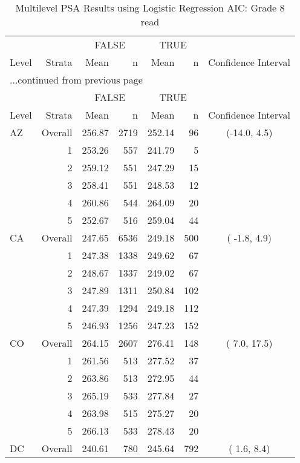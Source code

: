 \begin{longtable}{lrrr@{\extracolsep{.25cm}}rrc}
\caption{Multilevel PSA Results using Logistic Regression AIC: Grade 8 read} \\ 
   \hline & & \multicolumn{2}{c}{FALSE} & \multicolumn{2}{c}{TRUE} & \\ \cline{3-4} \cline{5-6} Level & Strata & Mean & n & Mean & n & Confidence Interval \\ \hline\endfirsthead \multicolumn{7}{l}{{...continued from previous page}}\\ \hline  & & \multicolumn{2}{c}{FALSE} & \multicolumn{2}{c}{TRUE} & \\ \cline{3-4} \cline{5-6} Level & Strata & Mean & n & Mean & n & Confidence Interval \\ \hline \endhead \endfoot \endlastfoot  \hline
AZ & Overall & 256.87 & 2719 & 252.14 &  96 & (-14.0,   4.5) \\ 
   & 1 & 253.26 & 557 & 241.79 &   5 &  \\ 
   & 2 & 259.12 & 551 & 247.29 &  15 &  \\ 
   & 3 & 258.41 & 551 & 248.53 &  12 &  \\ 
   & 4 & 260.86 & 544 & 264.09 &  20 &  \\ 
   & 5 & 252.67 & 516 & 259.04 &  44 &  \\ 
   \hline
CA & Overall & 247.65 & 6536 & 249.18 & 500 & ( -1.8,   4.9) \\ 
   & 1 & 247.38 & 1338 & 249.62 &  67 &  \\ 
   & 2 & 248.67 & 1337 & 249.02 &  67 &  \\ 
   & 3 & 247.89 & 1311 & 250.84 & 102 &  \\ 
   & 4 & 247.39 & 1294 & 249.18 & 112 &  \\ 
   & 5 & 246.93 & 1256 & 247.23 & 152 &  \\ 
   \hline
CO & Overall & 264.15 & 2607 & 276.41 & 148 & (  7.0,  17.5) \\ 
   & 1 & 261.56 & 513 & 277.52 &  37 &  \\ 
   & 2 & 263.86 & 513 & 272.95 &  44 &  \\ 
   & 3 & 265.19 & 533 & 277.84 &  27 &  \\ 
   & 4 & 263.98 & 515 & 275.27 &  20 &  \\ 
   & 5 & 266.13 & 533 & 278.43 &  20 &  \\ 
   \hline
DC & Overall & 240.61 & 780 & 245.64 & 792 & (  1.6,   8.4) \\ 

\end{longtable}
